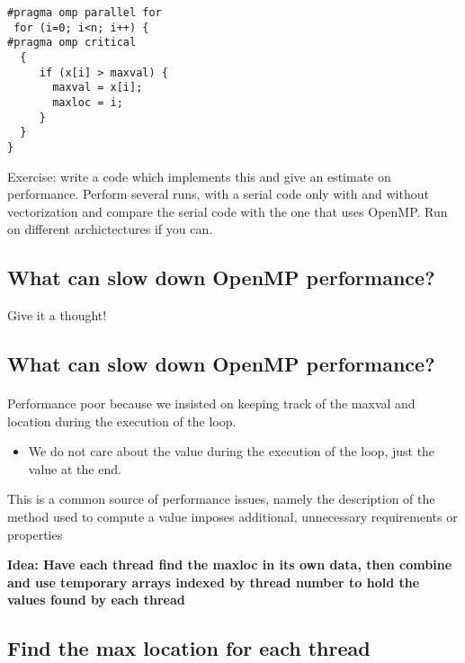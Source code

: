 \documentclass[%
oneside,                 %
final,                   %
10pt]{article}
\begin{document}
\begin{verbatim}
#pragma omp parallel for
 for (i=0; i<n; i++) {
#pragma omp critical
  {
     if (x[i] > maxval) {
       maxval = x[i];
       maxloc = i; 
     }
  }
} 

\end{verbatim}


Exercise: write a code which implements this and give an estimate on performance. Perform several runs,
with a serial code only with and without vectorization and compare the serial code with the one that  uses OpenMP. Run on different archictectures if you can.



\subsection*{What can slow down OpenMP performance?}
Give it a thought!

\subsection*{What can slow down OpenMP performance?}

\paragraph{}
Performance poor because we insisted on keeping track of the maxval and location during the execution of the loop.
\begin{itemize}
 \item We do not care about the value during the execution of the loop, just the value at the end.
\end{itemize}

\noindent
This is a common source of performance issues, namely the description of the method used to compute a value imposes additional, unnecessary requirements or properties

\textbf{Idea: Have each thread find the maxloc in its own data, then combine and use temporary arrays indexed by thread number to hold the values found by each thread}



\subsection*{Find the max location for each thread}
\end{document}
